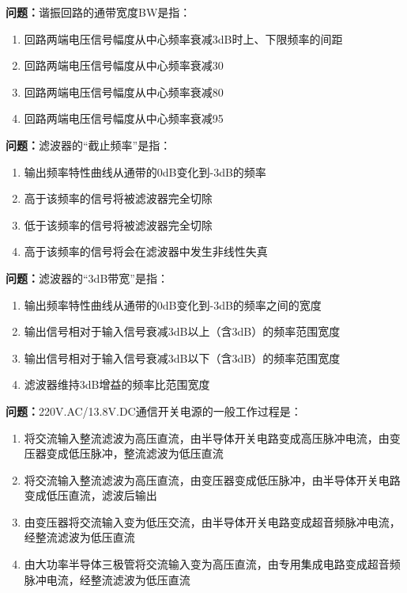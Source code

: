 \bigskip


\noindent\textbf{问题：}谐振回路的通带宽度BW是指：
\begin{enumerate}[label=\Alph*), leftmargin=3em]
\item 回路两端电压信号幅度从中心频率衰减3dB时上、下限频率的间距
\item 回路两端电压信号幅度从中心频率衰减30%
\item 回路两端电压信号幅度从中心频率衰减80%
\item 回路两端电压信号幅度从中心频率衰减95%
\end{enumerate}

\bigskip


\noindent\textbf{问题：}滤波器的“截止频率”是指：
\begin{enumerate}[label=\Alph*), leftmargin=3em]
\item 输出频率特性曲线从通带的0dB变化到-3dB的频率
\item 高于该频率的信号将被滤波器完全切除
\item 低于该频率的信号将被滤波器完全切除
\item 高于该频率的信号将会在滤波器中发生非线性失真
\end{enumerate}

\bigskip


\noindent\textbf{问题：}滤波器的“3dB带宽”是指：
\begin{enumerate}[label=\Alph*), leftmargin=3em]
\item 输出频率特性曲线从通带的0dB变化到-3dB的频率之间的宽度
\item 输出信号相对于输入信号衰减3dB以上（含3dB）的频率范围宽度
\item 输出信号相对于输入信号衰减3dB以下（含3dB）的频率范围宽度
\item 滤波器维持3dB增益的频率比范围宽度
\end{enumerate}

\bigskip


\noindent\textbf{问题：}220V.AC/13.8V.DC通信开关电源的一般工作过程是：
\begin{enumerate}[label=\Alph*), leftmargin=3em]
\item 将交流输入整流滤波为高压直流，由半导体开关电路变成高压脉冲电流，由变压器变成低压脉冲，整流滤波为低压直流
\item 将交流输入整流滤波为高压直流，由变压器变成低压脉冲，由半导体开关电路变成低压直流，滤波后输出
\item 由变压器将交流输入变为低压交流，由半导体开关电路变成超音频脉冲电流，经整流滤波为低压直流
\item 由大功率半导体三极管将交流输入变为高压直流，由专用集成电路变成超音频脉冲电流，经整流滤波为低压直流
\end{enumerate}

